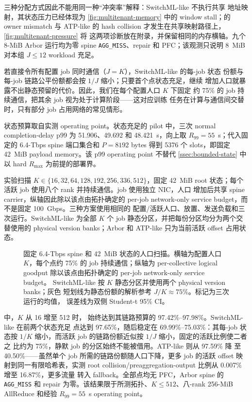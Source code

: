 三种分配方式因此不能用同一种``冲突率''解释：SwitchML-like 不执行共享
地址映射，其状态压力已经体现为 \cref{fig:multitenant-memory} 中的
window stall；\sysname 的 owner mismatch 与 ATP-like 的 hash
collision 才发生在共享映射路径上，\cref{fig:multitenant-pressure} 将
这两项诊断放在附录，并保留相同的内存横轴。九个 8-MiB Arbor 运行均为零
spine \texttt{AGG\_MISS}、repair 和 PFC；该观测只说明 8~MiB 对本组
$J\leq12$ workload 充足。

\FloatBarrier

若直接令所有配置 job 同时通信（$J=K$），SwitchML-like 的每-job 状态
份额与每-job 链路公平份额都会按 $1/J$ 缩小；只要首个点状态充足，继续
增加人口就暴露不出静态预留的代价。因此，我们在每个配置人口 $K$ 下固定
约 75\% 的 job 持续通信，把其余 job 视为处于计算阶段——这对应训练
任务在计算与通信间交替时，只有部分 job 占用网络的常见情形。

状态预算取自实测 operating point。状态充足的 pilot 中，三次 normal
completion-delay p99 为 51.906、49.692 和 48.421~\textmu s，向上取
$R_{99}=55$~\textmu s；代入固定的 6.4-Tbps spine 端口集合和 $P=8192$
bytes 得到 5376 个 slots，即固定 42~MiB payload memory。该 p99
operating point 不替代 \cref{ssec:bounded-state} 中以 hard
$R_{\max}$ 为前提的部署界。

实验扫描 $K\in\{16,32,64,128,192,256,336,512\}$，固定 42~MiB root
状态；每个活跃 job 使用八个 rank 并持续通信。job 使用独立 NIC，人口
增加后共享 spine carrier，纵轴因此除以该点由拓扑确定的 per-job
network-only service budget，而不是固定 100~Gbps。三种方案使用相同的
配置/活跃人口、放置、发送负载和三次运行。SwitchML-like 为全部 $K$ 个
job 静态分区，并把每份分区均分为两个交替使用的 physical version
banks；Arbor 和 ATP-like 只为当前活跃 offset 占用状态。

\begin{figure}[t]
\centering

\caption{固定 6.4-Tbps spine 和 42~MiB 状态的人口扫描。横轴为配置人口
$K$，每个点约 75\% 的 job 持续通信；纵轴为 per-collective logical
goodput 除以该点由拓扑确定的 per-job network-only service budget。
SwitchML-like 按 $K$ 静态分区并使用两个 physical version banks；灰色
短划线为静态份额的解析参考 $J/K\approx75\%$。标记为三次运行的均值，
误差线为双侧 Student-t 95\% CI。}
\label{fig:multitenant-population}
\end{figure}

 中，$K$ 从 16 增至 512 时，\sysname
始终达到其链路预算的 97.42\%--97.98\%。SwitchML-like 在前两个状态充足
点达到 97.65\%，随后稳定在 69.99\%--75.03\%：其每-job 状态按 $1/K$
缩小，而活跃 job 的链路份额近似按 $1/J$ 缩小，固定的活跃比例使二者之
比约为 75\%，静默 job 的分区始终不能被借用。ATP-like 则从 97.59\% 降
至 40.50\%——虽然单个 job 所需的链路份额随人口下降，更多 job 的活跃
offset 映射到同一有限哈希表，实测 root
collision/preaggregation-output 比例从 0.007\% 增至 16.87\%，更多流量
转入 fallback。全部点均无 PFC，Arbor spine 的 \texttt{AGG\_MISS} 和
repair 为零。该结果限于所测拓扑、$K\leq512$、八-rank 256-MiB
AllReduce 和经验 $R_{99}=55$~\textmu s operating point。

